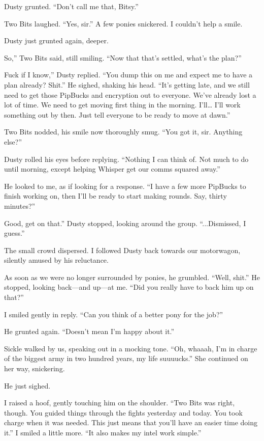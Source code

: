 Dusty grunted. “Don’t call me that, Bitsy.”

Two Bits laughed. “Yes, sir.” A few ponies snickered. I couldn’t help a smile.

Dusty just grunted again, deeper.

\leavevmode{}So,” Two Bits said, still smiling. “Now that that’s settled, what’s the plan?”

\leavevmode{}Fuck if I know,” Dusty replied. “You dump this on me and expect me to have a plan already? Shit.” He sighed, shaking his head. “It’s getting late, and we still need to get those PipBucks and encryption out to everyone. We’ve already lost a lot of time. We need to get moving first thing in the morning. I’ll… I’ll work something out by then. Just tell everyone to be ready to move at dawn.”

Two Bits nodded, his smile now thoroughly smug. “You got it, sir. Anything else?”

Dusty rolled his eyes before replying. “Nothing I can think of. Not much to do until morning, except helping Whisper get our comms squared away.”

He looked to me, as if looking for a response. “I have a few more PipBucks to finish working on, then I’ll be ready to start making rounds. Say, thirty minutes?”

\leavevmode{}Good, get on that.” Dusty stopped, looking around the group. “...Dismissed, I guess.”

The small crowd dispersed. I followed Dusty back towards our motorwagon, silently amused by his reluctance.

As soon as we were no longer surrounded by ponies, he grumbled. “Well, shit.” He stopped, looking back—and up—at me. “Did you really have to back him up on that?”

I smiled gently in reply. “Can you think of a better pony for the job?”

He grunted again. “Doesn’t mean I’m happy about it.”

Sickle walked by us, speaking out in a mocking tone. “Oh, whaaah, I’m in charge of the biggest army in two hundred years, my life suuuucks.” She continued on her way, snickering.

He just sighed.

I raised a hoof, gently touching him on the shoulder. “Two Bits was right, though. You guided things through the fights yesterday and today. You took charge when it was needed. This just means that you’ll have an easier time doing it.” I smiled a little more. “It also makes my intel work simple.”

